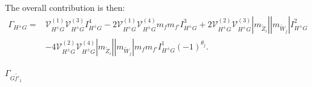 \documentclass[final,3p,times]{elsarticle}
\begin{document}
The overall contribution is then:
\begin{equation}
\begin{aligned}
\Gamma_{H^{\pm} G} = & \mathcal{V}_{H^{\pm} G}^{(1)}  \mathcal{V}_{H^{\pm} G}^{(3)}  I_{H^{\pm} G}^{4} - 2  \mathcal{V}_{H^{\pm} G}^{(1)}  \mathcal{V}_{H^{\pm} G}^{(4)} m_{f} m_{f'} I_{H^{\pm} G}^{3} + 2  \mathcal{V}_{H^{\pm} G}^{(2)}  \mathcal{V}_{H^{\pm} G}^{(3)}  |m_{\tilde{Z}_i}||m_{\tilde{W}_j}| I_{H^{\pm} G}^{2} \\ & - 4  \mathcal{V}_{H^{\pm} G}^{(2)}  \mathcal{V}_{H^{\pm} G}^{(4)} |m_{\tilde{Z}_i}||m_{\tilde{W}_j}|m_{f} m_{f'} I_{H^{\pm} G}^{1} (-1)^{\theta_j}.
\end{aligned}
\end{equation}


\textbf{\underline{$\Gamma_{G \tilde{f'}_1}$}}
\end{document}
